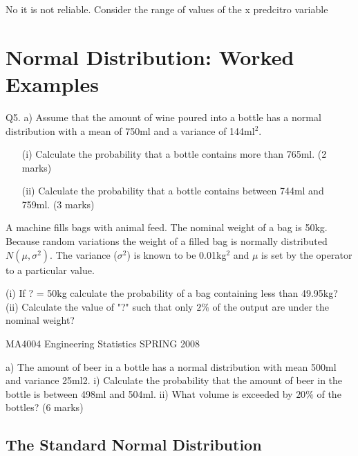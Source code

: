 \documentclass[12pt]{report}
\begin{document}
No it is not reliable. Consider the range of values of the x predcitro variable










\section{Normal Distribution: Worked Examples}



Q5. a) Assume that the amount of wine poured into a bottle has a normal distribution with a mean of 750ml and a variance of 144ml$^2$.

\begin{itemize}

\item[(i)]  Calculate the probability that a bottle contains more than 765ml. (2 marks)
\item[(ii)]    Calculate the probability that a bottle contains between 744ml and 759ml. (3 marks)
\end{itemize}
A machine fills bags with animal feed. The nominal weight of a bag is 50kg.
Because random variations the weight of a filled bag is normally distributed
$N(\mu, \sigma^2)$. The variance ($\sigma^2$) is known to be 0.01kg$^2$ and $\mu$ is set by the
operator to a particular value.

(i) If ? = 50kg calculate the probability of a bag containing less than
49.95kg?
(ii) Calculate the value of "?" such that only $2\%$ of the output are under the
nominal weight?



MA4004     Engineering Statistics    SPRING 2008


a)	The amount of beer in a bottle has a normal distribution with mean 500ml and variance 25ml2.
i)	Calculate the probability that the amount of beer in the bottle is between 498ml and 504ml.
ii)	What volume is exceeded by $20\%$ of the bottles?
(6 marks)






\subsection{The Standard Normal Distribution}
\end{document}
